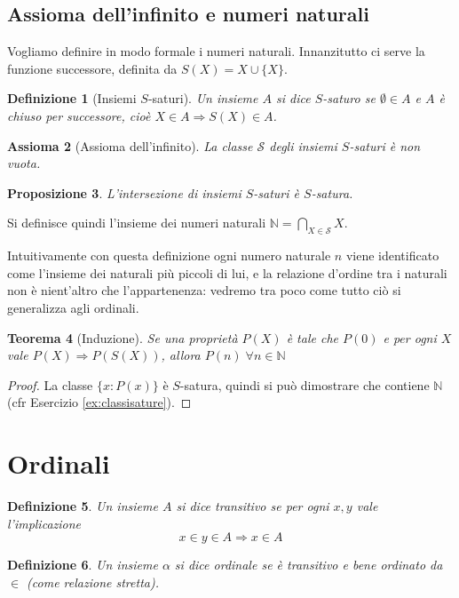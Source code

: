 \documentclass[a4paper,10pt,oneside]{article}
\newcommand{\myname}[1]{\emph{#1}}
\theoremstyle{plain}
\newtheorem{mytheorem}{Teorema}[section]
\newtheorem{mydef}[mytheorem]{Definizione}
\newtheorem{myprop}[mytheorem]{Proposizione}
\newtheorem{myax}[mytheorem]{Assioma}
\theoremstyle{definition}
\theoremstyle{remark}
\begin{document}
\subsection{Assioma dell'infinito e numeri naturali}

Vogliamo definire in modo formale i numeri naturali. Innanzitutto ci serve la funzione successore, definita da $S(X)=X\cup\{X\}$. 
\begin{mydef}[Insiemi $S$-saturi]
Un insieme $A$ si dice $S$-saturo se $\emptyset \in A$ e $A$ è chiuso per successore, cioè $X\in A \Rightarrow S(X)\in A$.
\end{mydef}
\begin{myax}[Assioma dell'infinito]
 La classe $\mathcal S$ degli insiemi $S$-saturi è non vuota.
\end{myax}

\begin{myprop}
 L'intersezione di insiemi $S$-saturi è $S$-satura.
\end{myprop}

Si definisce quindi l'insieme dei numeri naturali $\mathbb N = \bigcap_{X\in \mathcal S} X$. 

Intuitivamente con questa definizione ogni numero naturale $n$ viene identificato come l'insieme dei naturali più piccoli di lui, e la relazione d'ordine tra i naturali non è nient'altro che l'appartenenza: vedremo tra poco come tutto ciò si generalizza agli ordinali.

\begin{mytheorem}[Induzione]
 Se una proprietà $P(X)$ è tale che $P(0)$ e per ogni $X$ vale $P(X)\Rightarrow P(S(X))$, allora $P(n)\;\forall n\in \mathbb N$
\end{mytheorem}
\begin{proof}
 La classe $\{x: P(x)\}$ è $S$-satura, quindi si può dimostrare che contiene $\mathbb N$ (cfr Esercizio \ref{ex:classisature}).
\end{proof}


\section{Ordinali}

\begin{mydef}
 Un insieme $A$ si dice \myname{transitivo} se per ogni $x,y$ vale l'implicazione 
 \[x\in y \in A \Rightarrow x\in A\]
\end{mydef}

\begin{mydef}
Un insieme $\alpha$ si dice \myname{ordinale} se è transitivo e bene ordinato da $\in$ (come relazione stretta).
\end{mydef}
\end{document}
